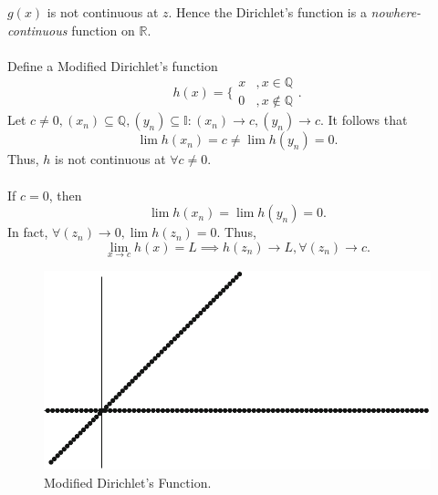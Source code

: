 \documentclass{article}
\begin{document}
            $g(x)$ is not continuous at $z$. Hence the Dirichlet's function is a \textit{nowhere-continuous} function on $\mathbb{R}$.
            \\ \\
            Define a Modified Dirichlet's function
            \begin{equation*}
                h(x) = \bigg\{ \begin{matrix}x &, x \in \mathbb{Q} \\ 0 &, x \notin \mathbb{Q} \end{matrix}.
            \end{equation*}
            Let $c \neq 0, (x_n) \subseteq \mathbb{Q}, (y_n) \subseteq \mathbb{I}: (x_n) \to c, (y_n) \to c$. It follows that
            \begin{equation*}
                \lim h(x_n) = c \neq \lim h(y_n) = 0.
            \end{equation*}
            Thus, $h$ is not continuous at $\forall c \neq 0$.
            \\ \\
            If $c=0$, then
            \begin{equation*}
                \lim h(x_n) = \lim h(y_n) = 0.
            \end{equation*}
            In fact, $\forall (z_n) \to 0, \lim h(z_n) = 0$. Thus,
            \begin{equation*}
                \lim_{x \to c} h(x) = L \implies h(z_n) \to L, \forall (z_n) \to c.
            \end{equation*}
            
            \begin{figure}[ht!]
                \centering
                \includegraphics[width=0.6\linewidth]{figs/modified dirichlet.png}
                \caption{Modified Dirichlet's Function.}
                \label{dirichlet}
            \end{figure}
            
\end{document}
